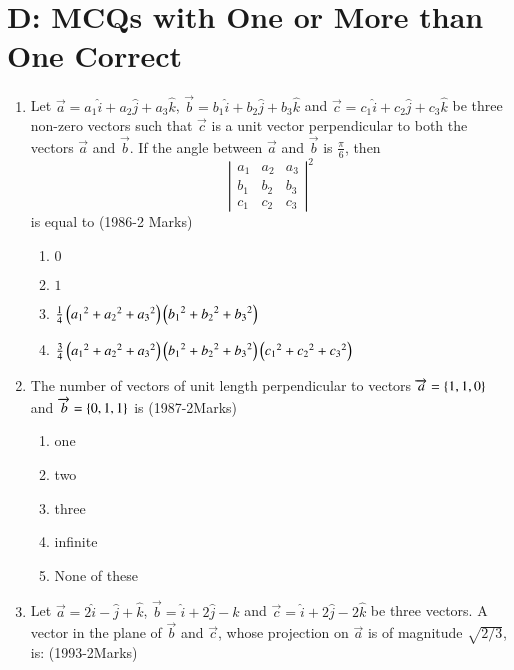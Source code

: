 \documentclass[journal,12pt,twocolumn]{IEEEtran}
\theoremstyle{remark}
\begin{document}
 \section{D: MCQs with One or More than One Correct}
\begin{enumerate}
	\item %
		Let $\overrightarrow{a}=a_1\hat{i}+a_2\hat{j}+a_3\hat{k}$, $\overrightarrow{b}=b_1\hat{i}+b_2\hat{j}+b_3\hat{k}$ and $\overrightarrow{c}=c_1\hat{i}+c_2\hat{j}+c_3\hat{k}$ be three non-zero vectors such that $\overrightarrow{c}$ is a unit vector perpendicular to both the vectors $\overrightarrow{a}$ and $\overrightarrow{b}$. If the angle between $\overrightarrow{a}$ and $\overrightarrow{b}$ is $\frac{\pi}{6}$, then \\
\[
\left| \begin{matrix}
a_1 & a_2 & a_3 \\
b_1 & b_2 & b_3 \\
c_1 & c_2 & c_3
\end{matrix} \right|^2
\]
 is equal to \hfill{(1986-2 Marks)}\\
		\begin{enumerate}
			\item $0$
			\item $1$
			\item $\frac{1}{4}\left({a_1}^2+{a_2}^2+{a_3}^2\right)\left({b_1}^2+{b_2}^2+{b_3}^2\right)$
			\item $\frac{3}{4}\left({a_1}^2+{a_2}^2+{a_3}^2\right)\left({b_1}^2+{b_2}^2+{b_3}^2\right)\left({c_1}^2+{c_2}^2+{c_3}^2\right)$
		\end{enumerate}
\item %
	The number of vectors of unit length perpendicular to vectors $\overrightarrow{a}=\left\{1,1,0\right\}$ and $\overrightarrow{b}=\left\{0,1,1\right\}$ is \hfill{(1987-2Marks)}\\
		\begin{enumerate}
			\item one
		        \item two
			\item three
			\item infinite
			\item None of these
		\end{enumerate}
\item %
	Let $\overrightarrow{a}=2\hat{i}-\hat{j}+\hat{k}$, $\overrightarrow{b}=\hat{i}+2\hat{j}-\hat{k}$ and $\overrightarrow{c}=\hat{i}+2\hat{j}-2\hat{k}$ be three vectors. A vector in the plane of $\overrightarrow{b}$ and $\overrightarrow{c}$, whose projection on $\overrightarrow{a}$ is of magnitude $\sqrt{2/3}$, is: \hfill{(1993-2Marks)}\\

\end{enumerate}
\end{document}
